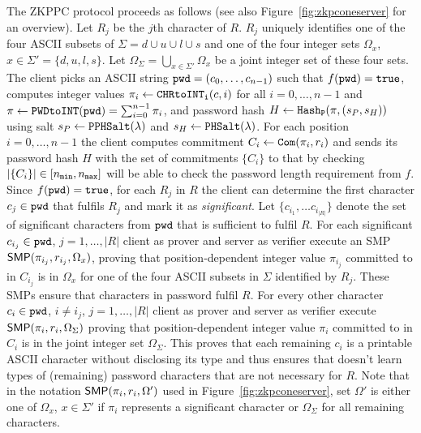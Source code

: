 The \ac{ZKPPC} protocol proceeds as follows (see also Figure~\ref{fig:zkpconeserver} for an overview). 
Let $R_j$ be the $j$th character of $R$. 
$R_j$ uniquely identifies one of the four \ac{ASCII} subsets of $\Sigma = d \cup u \cup l \cup s$ and one of the four integer sets $\Omega_x$, $x\in\Sigma'=\{d, u, l, s\}$. 
Let $\Omega_\Sigma=\bigcup_{x\in\Sigma'}\Omega_x$ be a joint integer set of these four sets. 
The client picks an \ac{ASCII} string $\mathtt{pwd}=(c_0,\ldots,c_{n-1})$ such that $f(\mathtt{pwd})=\mathtt{true}$, computes integer values $\pi_i\gets\texttt{CHRtoINT}_\texttt{i}(c, i)$ for all $i= 0,\ldots, n-1$ and $\pi \gets \texttt{PWDtoINT}(\mathtt{pwd}) = \sum_{i=0}^{n-1}\pi_i$, and password hash $H\gets \mathtt{Hash_P}(\pi, (s_P, s_H))$ using salt $s_P\gets\mathtt{PPHSalt}(\lambda)$ and $s_H\gets\mathtt{PHSalt}(\lambda)$. 
For each position $i=0,\ldots,n-1$ the client computes commitment $C_i \gets \mathtt{Com}(\pi_i, r_i)$ and sends its password hash $H$ with the set of commitments $\{C_i\}$ to \Server that by checking $|\{C_i\}|\in[{n_\mathtt{min}},{n_\mathtt{max}}]$ will be able to check the password length requirement from $f$. 
Since $f(\mathtt{pwd})=\mathtt{true}$, for each $R_j$ in $R$ the client can determine the first character $c_j\in\mathtt{pwd}$ that fulfils $R_j$ and mark it as \emph{significant}. 
Let $\{c_{i_1},\ldots c_{i_{|R|}}\}$ denote the set of significant characters from $\mathtt{pwd}$ that is sufficient to fulfil $R$. 
For each significant $c_{i_j}\in\mathtt{pwd}$, $j=1,\ldots, |R|$ client \Client as prover and server \Server as verifier execute an \ac{SMP} $\mathsf{SMP}(\pi_{i_j},r_{i_j},\Omega_x)$, \ie proving that position-dependent integer value $\pi_{i_j}$ committed to in $C_{i_j}$ is in $\Omega_x$ for one of the four \ac{ASCII} subsets in $\Sigma$ identified by $R_j$. 
These \acp{SMP} ensure that characters in password \pwd fulfil $R$. 
For every other character $c_i\in\mathtt{pwd}$, $i\neq i_j$, $j=1,\ldots, |R|$ client \Client as prover and server \Server as verifier execute $\mathsf{SMP}(\pi_{i},r_{i},\Omega_\Sigma)$ proving that position-dependent integer value $\pi_{i}$ committed to in $C_{i}$ is in the joint integer set $\Omega_{\Sigma}$. 
This proves that each remaining $c_i$ is a printable \ac{ASCII} character without disclosing its type and thus ensures that \Server doesn't learn types of (remaining) password characters that are not necessary for $R$. 
Note that in the notation $\mathsf{SMP}(\pi_i,r_i,\Omega')$ used in Figure~\ref{fig:zkpconeserver}, set $\Omega'$ is either one of $\Omega_x$, $x\in\Sigma'$ if $\pi_i$ represents a significant character or $\Omega_\Sigma$ for all remaining characters.

